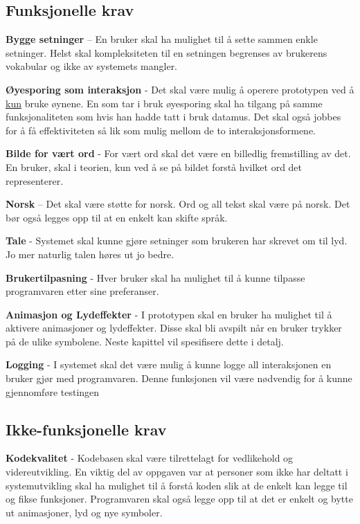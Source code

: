 \subsection{Funksjonelle krav} 
 
\textbf{Bygge setninger} – En bruker skal ha mulighet til å sette sammen enkle setninger. Helst skal kompleksiteten til  en setningen begrenses av brukerens vokabular og ikke av systemets mangler.
 
\textbf{Øyesporing som interaksjon} - Det skal være mulig å operere prototypen ved å \underline{kun} bruke øynene. En som tar i bruk øyesporing skal ha tilgang  på samme funksjonaliteten som hvis han hadde tatt i bruk datamus. Det skal også jobbes for å få effektiviteten så lik som mulig mellom de to interaksjonsformene. 
 
\textbf{Bilde for vært ord} - For vært ord skal det være en billedlig fremstilling av det. En bruker, skal i teorien, kun ved å se på bildet forstå hvilket ord det representerer. 

\textbf{Norsk} – Det skal være støtte for norsk. Ord og all tekst skal være på norsk.
Det bør også legges opp til at en enkelt kan skifte språk. 

\textbf{Tale} - Systemet skal kunne gjøre setninger som brukeren har skrevet om til lyd. Jo mer naturlig talen høres ut jo bedre.
  
\textbf{Brukertilpasning} - Hver bruker skal ha mulighet til å kunne tilpasse programvaren etter sine preferanser.
  
\textbf{Animasjon og Lydeffekter } - I prototypen skal en bruker ha mulighet til å aktivere animasjoner og lydeffekter. Disse skal bli avspilt når en bruker trykker på de ulike symbolene.  Neste kapittel vil spesifisere dette i detalj.

\textbf{Logging} - I systemet skal det være mulig å kunne logge all interaksjonen en bruker gjør med programvaren. Denne funksjonen vil være nødvendig for å kunne gjennomføre testingen 

\subsection{Ikke-funksjonelle krav} 
 
\textbf{Kodekvalitet} - Kodebasen skal være tilrettelagt for vedlikehold og videreutvikling. En viktig del av oppgaven var at personer som ikke har deltatt i systemutvikling skal ha mulighet til å forstå koden slik at de enkelt kan legge til og fikse funksjoner. Programvaren skal også legge opp til at det er enkelt og bytte ut animasjoner, lyd og nye symboler. 

